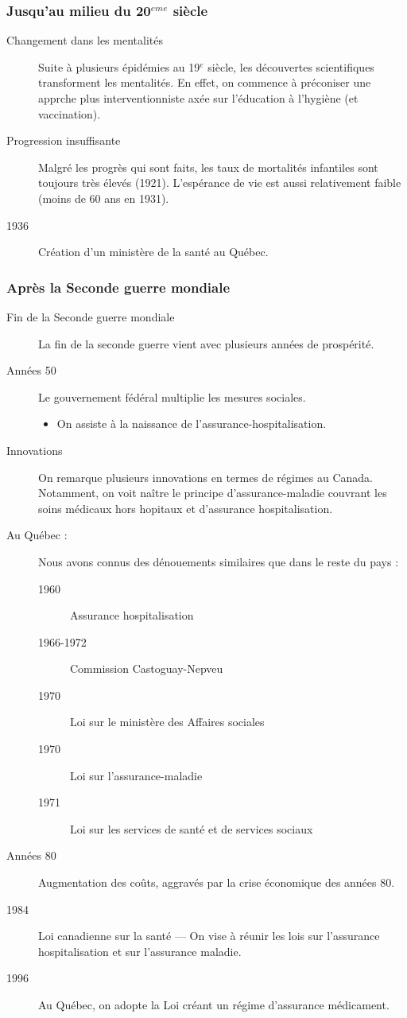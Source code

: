 \documentclass[10pt, french]{article}
\begin{document}
\begin{multicols*}{3}
\subsubsection*{Jusqu'au milieu du 20$^{eme}$ siècle}
\begin{description}
\item[Changement dans les mentalités]	Suite à plusieurs épidémies au 19$^{e}$ siècle, les découvertes scientifiques transforment les mentalités. En effet, on commence à préconiser une apprche plus interventionniste axée sur l'éducation à l'hygiène (et vaccination).
\item[Progression insuffisante] Malgré les progrès qui sont faits, les taux de mortalités infantiles sont toujours très élevés (1921). L'espérance de vie est aussi relativement faible (moins de 60 ans en 1931). 
\item[1936]	Création d'un ministère de la santé au Québec. 
\end{description}
\subsubsection*{Après la Seconde guerre mondiale}
\begin{description}
\item[Fin de la Seconde guerre mondiale] La fin de la seconde guerre vient avec plusieurs années de prospérité.
\item[Années 50] Le gouvernement fédéral multiplie les mesures sociales.
	\begin{itemize}
	\item	On assiste à la naissance de l'assurance-hospitalisation.
	\end{itemize}
\item[Innovations] On remarque plusieurs innovations en termes de régimes au Canada. Notamment, on voit naître le principe d'assurance-maladie couvrant les soins médicaux hors hopitaux et d'assurance hospitalisation.
\item[Au Québec : ] Nous avons connus des dénouements similaires que dans le reste du pays :
	\begin{description}
	\item[1960]	Assurance hospitalisation
	\item[1966-1972] Commission Castoguay-Nepveu
	\item[1970] Loi sur le ministère des Affaires sociales 
	\item[1970]	Loi sur l'assurance-maladie
	\item[1971]	Loi sur les services de santé et de services sociaux
	\end{description}	
\item[Années 80] Augmentation des coûts, aggravés par la crise économique des années 80.
\item[1984] Loi canadienne sur la santé --- On vise à réunir les lois sur l'assurance hospitalisation et sur l'assurance maladie.
\item[1996] Au Québec, on adopte la Loi créant un régime d'assurance médicament. 
\end{description}



\end{multicols*}
\end{document}
